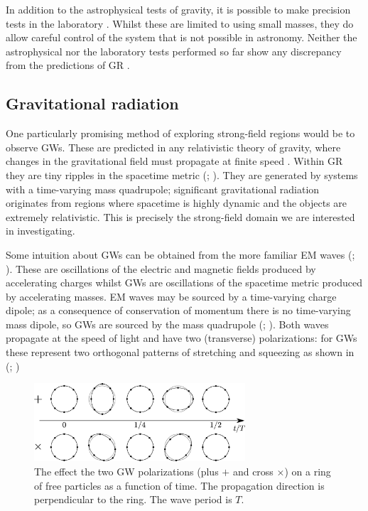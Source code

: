 In addition to the astrophysical tests of gravity, it is possible to make precision tests in the laboratory \citep{Kapner2007a,Adelberger2009,Wagner2012}. Whilst these are limited to using small masses, they do allow careful control of the system that is not possible in astronomy. Neither the astrophysical nor the laboratory tests performed so far show any discrepancy from the predictions of GR \citep{Will2006}. 

\subsection{Gravitational radiation}

One particularly promising method of exploring strong-field regions would be to observe GWs. These are predicted in any relativistic theory of gravity, where changes in the gravitational field must propagate at finite speed \citep{Schutz1984}. Within GR they are tiny ripples in the spacetime metric (\citealt[section 35.1]{Misner1973}; \citealt[section 107]{Landau1975}). They are generated by systems with a time-varying mass quadrupole; significant gravitational radiation originates from regions where spacetime is highly dynamic and the objects are extremely relativistic. This is precisely the strong-field domain we are interested in investigating.

Some intuition about GWs can be obtained from the more familiar EM waves (\citealt[sections 46--48 and 66--67]{Landau1975}; \citealt[sections 7.1 and 9.1--9.3]{Jackson1999}). These are oscillations of the electric and magnetic fields produced by accelerating charges whilst GWs are oscillations of the spacetime metric produced by accelerating masses. EM waves may be sourced by a time-varying charge dipole; as a consequence of conservation of momentum there is no time-varying mass dipole, so GWs are sourced by the mass quadrupole (\citealt[section 18.5]{Hobson2006}; \citealt[section 15.4]{Rindler2006}). Both waves propagate at the speed of light and have two (transverse) polarizations: for GWs these represent two orthogonal patterns of stretching and squeezing as shown in  (\citealt[section 34]{Dirac1996}; \citealt[section 18.4]{Hobson2006})
\begin{figure}
  \begin{center}
  \includegraphics[width=0.7\textwidth]{./images/Polarization}
    \caption{The effect the two GW polarizations (plus $+$ and cross $\times$) on a ring of free particles as a function of time. The propagation direction is perpendicular to the ring. The wave period is $T$.}   
    \label{fig:plus-cross} 
  \end{center}
\end{figure}

